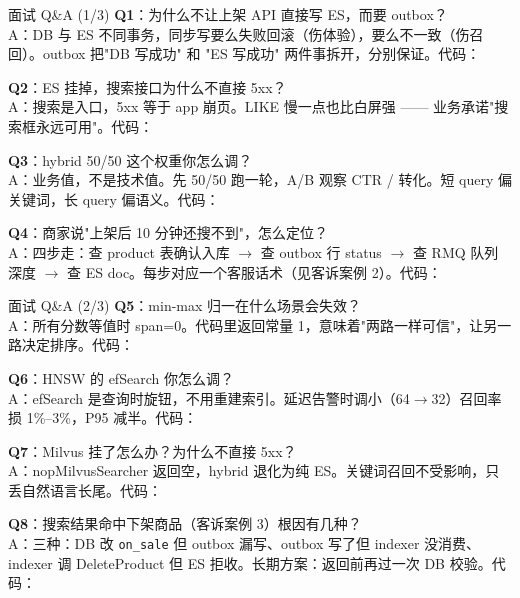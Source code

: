 \documentclass[aspectratio=169,11pt]{beamer}
\begin{document}
\appendix

\begin{frame}[shrink]{面试 Q\&A (1/3)}
\textbf{Q1}：为什么不让上架 API 直接写 ES，而要 outbox？\\
\hspace{4mm}\small A：DB 与 ES 不同事务，同步写要么失败回滚（伤体验），要么不一致（伤召回）。outbox 把"DB 写成功" 和 "ES 写成功" 两件事拆开，分别保证。代码：

\vspace{2mm}
\textbf{Q2}：ES 挂掉，搜索接口为什么不直接 5xx？\\
\hspace{4mm}\small A：搜索是入口，5xx 等于 app 崩页。LIKE 慢一点也比白屏强 —— 业务承诺"搜索框永远可用"。代码：

\vspace{2mm}
\textbf{Q3}：hybrid 50/50 这个权重你怎么调？\\
\hspace{4mm}\small A：业务值，不是技术值。先 50/50 跑一轮，A/B 观察 CTR / 转化。短 query 偏关键词，长 query 偏语义。代码：

\vspace{2mm}
\textbf{Q4}：商家说"上架后 10 分钟还搜不到"，怎么定位？\\
\hspace{4mm}\small A：四步走：查 product 表确认入库 $\to$ 查 outbox 行 status $\to$ 查 RMQ 队列深度 $\to$ 查 ES doc。每步对应一个客服话术（见客诉案例 2）。代码：
\end{frame}

\begin{frame}[shrink]{面试 Q\&A (2/3)}
\textbf{Q5}：min-max 归一在什么场景会失效？\\
\hspace{4mm}\small A：所有分数等值时 span=0。代码里返回常量 1，意味着"两路一样可信"，让另一路决定排序。代码：

\vspace{2mm}
\textbf{Q6}：HNSW 的 efSearch 你怎么调？\\
\hspace{4mm}\small A：efSearch 是查询时旋钮，不用重建索引。延迟告警时调小（64$\to$32）召回率损 1\%--3\%，P95 减半。代码：

\vspace{2mm}
\textbf{Q7}：Milvus 挂了怎么办？为什么不直接 5xx？\\
\hspace{4mm}\small A：nopMilvusSearcher 返回空，hybrid 退化为纯 ES。关键词召回不受影响，只丢自然语言长尾。代码：

\vspace{2mm}
\textbf{Q8}：搜索结果命中下架商品（客诉案例 3）根因有几种？\\
\hspace{4mm}\small A：三种：DB 改 \texttt{on\_sale} 但 outbox 漏写、outbox 写了但 indexer 没消费、indexer 调 DeleteProduct 但 ES 拒收。长期方案：返回前再过一次 DB 校验。代码：
\end{frame}
\end{document}
